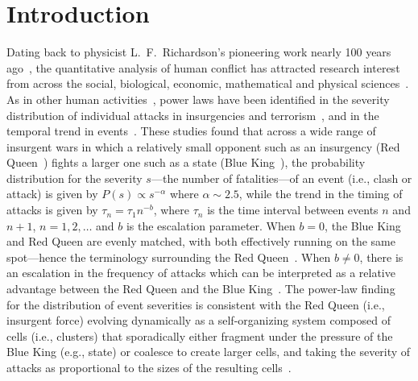 \documentclass[preprint,12pt]{elsarticle}
\begin{document}
\linenumbers

\section*{Introduction}
Dating back to physicist L.~F.~Richardson's pioneering
work nearly 100 years ago~\cite{Richardson194}, the quantitative
analysis of human conflict has attracted research interest from across
the social, biological, economic, mathematical and physical
sciences~\cite{Morgenstern2013,Cederman2003,Clauset2009,Clauset,Bohorquez2009a,Dedeo2011}.
As in other human activities~\cite{Barabasi2005,Gabaix2003}, power
laws have been identified in the severity distribution of individual
attacks in insurgencies and
terrorism~\cite{Johnson2013b,Clauset2009,Clauset,Bohorquez2009a}, and
in the temporal trend in
events~\cite{Johnson2013b,Johnson2011a,Clauset}. These studies found
that across a wide range of insurgent wars in which a relatively small
opponent such as an insurgency (Red Queen~\cite{Johnson2011a}) fights
a larger one such as a state (Blue King~\cite{Johnson2011a}), the
probability distribution for the severity $s$---the number of fatalities---of an event (i.e., clash
or attack) is given by $P(s) \propto s^{-\alpha}$ where $\alpha \sim
2.5$, while the trend in the timing of attacks is given by $\tau_{n}
= \tau_1 n^{-b}$, where $\tau_n$ is the time interval
between events $n$ and $n+1$, $n=1,2,\dots$ and $b$ is the escalation
parameter. When $b=0$, the Blue King and Red Queen are evenly matched,
with both effectively running on the same spot---hence the terminology
surrounding the Red Queen~\cite{Johnson2011a}. When $b\neq 0$, there
is an escalation in the frequency of attacks which can be interpreted
as a relative advantage between the Red Queen and the Blue King~\cite{Johnson2011a}. The power-law finding for the distribution
of event severities is consistent with the Red Queen (i.e., insurgent
force) evolving dynamically as a self-organizing system composed of
cells (i.e., clusters) that sporadically either fragment under the
pressure of the Blue King (e.g., state) or coalesce to create larger
cells, and taking the severity of attacks as proportional to the sizes
of the resulting cells~\cite{Bohorquez2009a}.
\end{document}
